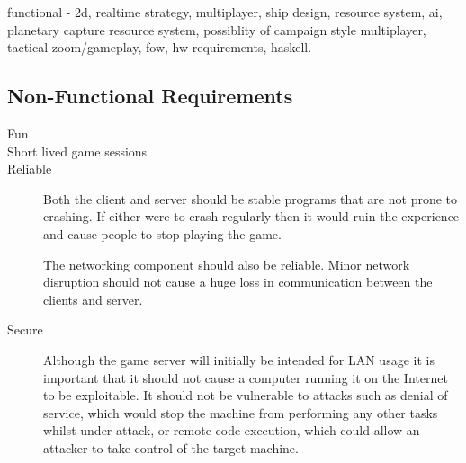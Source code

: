 functional - 2d, realtime strategy, multiplayer, ship design, resource system, ai, planetary capture resource system, possiblity of campaign style multiplayer, tactical zoom/gameplay, fow, hw requirements, haskell.


\subsection{Non-Functional Requirements}

\begin{description}

	\item[Fun]

	\item[Short lived game sessions]

	\item[Reliable]

		Both the client and server should be stable programs that are not prone to
		crashing. If either were to crash regularly then it would ruin the experience
		and cause people to stop playing the game.

		The networking component should also be reliable. Minor network disruption should
		not cause a huge loss in communication between the clients and server.

	\item[Secure]

		Although the game server will initially be intended for LAN usage it is
		important that it should not cause a computer running it on the Internet to be
		exploitable. It should not be vulnerable to attacks such as denial of service,
		which would stop the machine from performing any other tasks whilst under attack,
		or remote code execution, which could allow an attacker to take control of the
		target machine.

\end{description}


